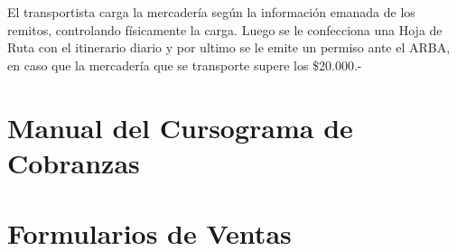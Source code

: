 \begin{description}
	El transportista carga la mercader\'ia seg\'un la información emanada de los remitos, controlando f\'isicamente la carga.  Luego se le confecciona una Hoja de Ruta con el itinerario diario y por ultimo se le emite un permiso ante el ARBA, en caso que la mercader\'ia que se transporte supere los \$20.000.-   
\end{description}

\pagebreak
\section{Manual del Cursograma de Cobranzas}


\pagebreak
\section{Formularios de Ventas}

